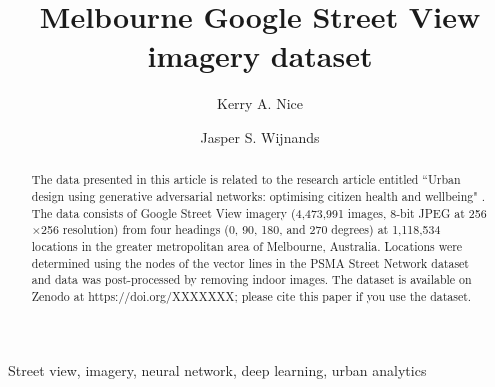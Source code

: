\documentclass[final,3p,times,authoryear]{elsarticle}
\begin{document}
\begin{frontmatter}



\title{Melbourne Google Street View imagery dataset} 

\author[melb]{Kerry A. Nice}
\author[melb]{Jasper S. Wijnands}
\address[melb]{Transport, Health and Urban Design, Melbourne School of Design, The University of Melbourne, Parkville VIC 3010, Australia}

\begin{abstract}

The data presented in this article is related to the research article entitled ``Urban design using generative adversarial networks: optimising citizen health and wellbeing" \citep{wijnands2018urban}. The data consists of Google Street View imagery (4,473,991 images, 8-bit JPEG at 256$\times$256 resolution) from four headings (0, 90, 180, and 270 degrees) at 1,118,534 locations in the greater metropolitan area of Melbourne, Australia. Locations were determined using the nodes of the vector lines in the PSMA Street Network dataset \citep{PSMA2018} and data was post-processed by removing indoor images. The dataset is available on Zenodo at https://doi.org/XXXXXXX; please cite this paper if you use the dataset.

\end{abstract}

\begin{keyword}
Street view, imagery, neural network, deep learning, urban analytics
\end{keyword}

\end{frontmatter}
\end{document}

